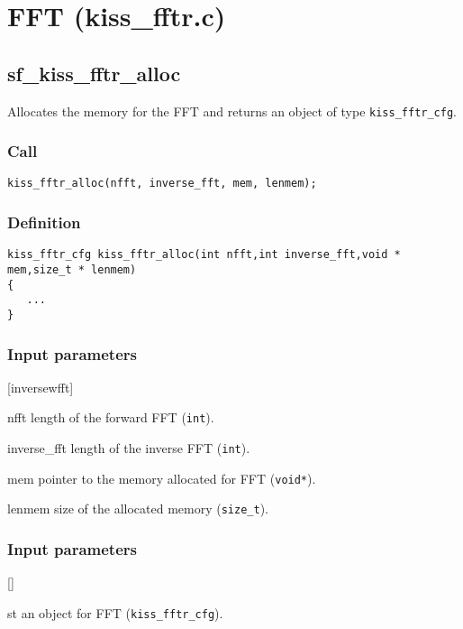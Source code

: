 \section{FFT (kiss\_fftr.c)}

\subsection{{sf\_kiss\_fftr\_alloc}}
Allocates the memory for the FFT and returns an object of type \texttt{kiss\_fftr\_cfg}.

\subsubsection*{Call}
\begin{verbatim}kiss_fftr_alloc(nfft, inverse_fft, mem, lenmem);\end{verbatim}

\subsubsection*{Definition}
\begin{verbatim}
kiss_fftr_cfg kiss_fftr_alloc(int nfft,int inverse_fft,void * mem,size_t * lenmem)
{
   ...
}
\end{verbatim}

\subsubsection*{Input parameters}
\begin{desclist}{\tt}{\quad}[inversewfft]
   \setlength\itemsep{0pt}
   \item[nfft]         length of the forward FFT (\texttt{int}).  
   \item[inverse\_fft] length of the inverse FFT (\texttt{int}).  
   \item[mem]          pointer to the memory allocated for FFT (\texttt{void*}).
   \item[lenmem]       size of the allocated memory (\texttt{size\_t}).
\end{desclist}

\subsubsection*{Input parameters}
\begin{desclist}{\tt}{\quad}[]
   \item[st] an object for FFT (\texttt{kiss\_fftr\_cfg}).
\end{desclist}
 




